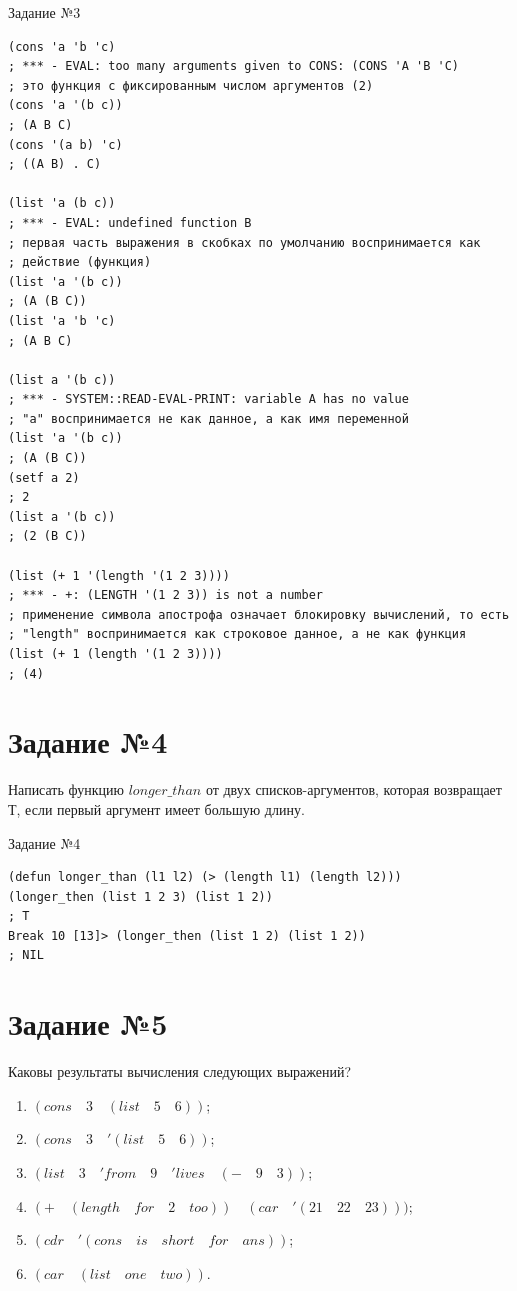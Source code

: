 \newpage

\begin{code}
\caption{Задание №3}
\label{code:bf4}
\begin{verbatim}
(cons 'a 'b 'c)
; *** - EVAL: too many arguments given to CONS: (CONS 'A 'B 'C)
; это функция с фиксированным числом аргументов (2)
(cons 'a '(b c))
; (A B C)
(cons '(a b) 'c)
; ((A B) . C)

(list 'a (b c))
; *** - EVAL: undefined function B
; первая часть выражения в скобках по умолчанию воспринимается как
; действие (функция)
(list 'a '(b c))
; (A (B C))
(list 'a 'b 'c)
; (A B C)

(list a '(b c))
; *** - SYSTEM::READ-EVAL-PRINT: variable A has no value
; "а" воспринимается не как данное, а как имя переменной
(list 'a '(b c))
; (A (B C))
(setf a 2)
; 2
(list a '(b c))
; (2 (B C))

(list (+ 1 '(length '(1 2 3))))
; *** - +: (LENGTH '(1 2 3)) is not a number
; применение символа апострофа означает блокировку вычислений, то есть 
; "length" воспринимается как строковое данное, а не как функция
(list (+ 1 (length '(1 2 3))))
; (4)
\end{verbatim}
\end{code}

\newpage

\section{Задание №4}
Написать функцию $longer \text{\_} than$ от двух списков-аргументов, которая возвращает $Т$, если первый аргумент имеет большую длину.

\begin{code}
\caption{Задание №4}
\label{code:bf4}
\begin{verbatim}
(defun longer_than (l1 l2) (> (length l1) (length l2)))
(longer_then (list 1 2 3) (list 1 2))
; T
Break 10 [13]> (longer_then (list 1 2) (list 1 2))
; NIL
\end{verbatim}
\end{code}

\section{Задание №5}
Каковы результаты вычисления следующих выражений?
\begin{enumerate}
	\item $(cons \quad 3 \quad (list \quad 5 \quad 6))$;
	\item $(cons \quad 3 \quad '(list \quad 5 \quad 6))$;
	\item $(list \quad 3 \quad 'from \quad 9 \quad 'lives \quad (- \quad 9 \quad 3))$;
	\item $(+ \quad (length \quad for \quad 2 \quad too)) \quad (car \quad '(21 \quad 22 \quad 23)))$;
	\item $(cdr \quad '(cons \quad is \quad short \quad for \quad ans))$;
	\item $(car \quad (list \quad one \quad two))$.
\end{enumerate}

